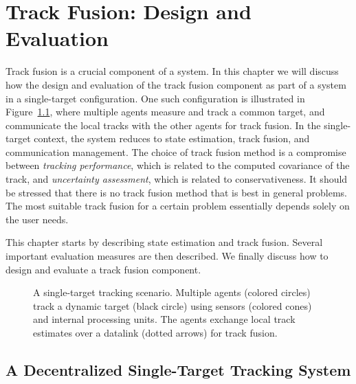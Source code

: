

\chapter{Track Fusion: Design and Evaluation} \label{cha:track-fusion-evaluation}

Track fusion is a crucial component of a \abbrDTT system. In this chapter we will discuss how the design and evaluation of the track fusion component as part of a \abbrDTT system in a single-target configuration. One such configuration is illustrated in Figure~\ref{fig:dstt:sst-scenario}, where multiple agents measure and track a common target, and communicate the local tracks with the other agents for track fusion. In the single-target context, the \abbrDTT system reduces to state estimation, track fusion, and communication management. The choice of track fusion method is a compromise between \emph{tracking performance}, which is related to the computed covariance of the track, and \emph{uncertainty assessment}, which is related to conservativeness. It should be stressed that there is no track fusion method that is best in general problems. The most suitable track fusion for a certain problem essentially depends solely on the user needs. %

This chapter starts by describing state estimation and track fusion. Several important evaluation measures are then described. We finally discuss how to design and evaluate a track fusion component.

\begin{figure}[b]
	\centering
	\begin{tikzpicture}[scale=.25]
		
	\end{tikzpicture}	
	\caption{A single-target tracking scenario. Multiple agents (colored circles) track a dynamic target (black circle) using sensors (colored cones) and internal processing units. The agents exchange local track estimates over a datalink (dotted arrows) for track fusion. } 
	\label{fig:dstt:sst-scenario}
\end{figure}




\section{A Decentralized Single-Target Tracking System}

